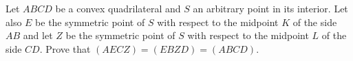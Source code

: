 Let $ABCD$ be a convex quadrilateral and $S$ an arbitrary point in its interior. Let also $E$ be the symmetric point of $S$ with respect to the midpoint $K$ of the side $AB$ and let $Z$  be the symmetric point of $S$ with respect to the midpoint $L$ of the side $CD$. Prove that  $(AECZ) = (EBZD) = (ABCD)$.